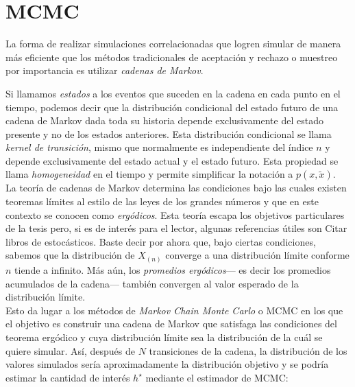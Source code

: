 \section{MCMC}

La forma de realizar simulaciones correlacionadas que logren simular de manera más eficiente que los métodos tradicionales de aceptación y rechazo o muestreo por importancia es utilizar \textit{cadenas de Markov}.


Si llamamos \textit{estados} a los eventos que suceden en la cadena en cada punto en el tiempo, podemos decir que la distribución condicional del estado futuro de una cadena de Markov dada toda su historia depende exclusivamente del estado presente y no de los estados anteriores. Esta distribución condicional se llama \textit{kernel de transición}, mismo que normalmente es independiente del índice $n$ y depende exclusivamente del estado actual y el estado futuro. Esta propiedad se llama \textit{homogeneidad} en el tiempo y permite simplificar la notación a $p(x,\tilde{x})$.\\ 

La teoría de cadenas de Markov determina las condiciones bajo las cuales existen teoremas límites al estilo de las leyes de los grandes números y que en este contexto se conocen como \textit{ergódicos}. Esta teoría escapa los objetivos particulares de la tesis pero, si es de interés para el lector, algunas referencias útiles son {\color{Red} Citar libros de estocásticos}. Baste decir por ahora que, bajo ciertas condiciones, sabemos que la distribución de $X_{(n)}$ converge a una distribución límite conforme $n$ tiende a infinito. Más aún, los \textit{promedios ergódicos}--- es decir los promedios acumulados de la cadena--- también convergen al valor esperado de la distribución límite.\\ 

Esto da lugar a los métodos de \textit{Markov Chain Monte Carlo} o MCMC en los que el objetivo es construir una cadena de Markov que satisfaga las condiciones del teorema ergódico y cuya distribución límite sea la distribución de la cuál se quiere simular. Así, después de $N$ transiciones de la cadena, la distribución de los valores simulados sería aproximadamente la distribución objetivo y se podría estimar la cantidad de interés $h^\star$ mediante el estimador de MCMC: 

